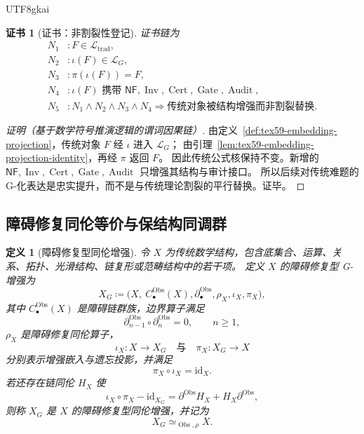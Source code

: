 \documentclass[12pt]{article}
\newtheorem{definition}{定义}[section]
\newtheorem{Certificate}{证书}[section]
\newcommand{\NF}{\mathsf{NF}}
\newcommand{\DefEq}{\coloneqq}
\newcommand{\id}{\mathrm{id}}
\DeclareMathOperator{\Cert}{Cert}
\DeclareMathOperator{\Audit}{Audit}
\DeclareMathOperator{\Gate}{Gate}
\DeclareMathOperator{\Obs}{Obs}
\DeclareMathOperator{\Inv}{Inv}
\begin{document}
\begin{CJK*}{UTF8}{gkai}
\begin{Certificate}[证书：非割裂性登记]
\label{cert:tex59-non-separated-traditional-problems}
证书链为
\[
\begin{aligned}
  N_1 &: F\in\mathcal L_{\mathrm{trad}},\\
  N_2 &: \iota(F)\in\mathcal L_G,\\
  N_3 &: \pi(\iota(F))=F,\\
  N_4 &: \iota(F)\text{ 携带 }\NF,\Inv,\Cert,\Gate,\Audit,\\
  N_5 &: N_1\wedge N_2\wedge N_3\wedge N_4
         \Rightarrow
         \text{传统对象被结构增强而非割裂替换}.
\end{aligned}
\]
\end{Certificate}

\begin{proof}[证明（基于数学符号推演逻辑的谓词因果链）]
由定义~\ref{def:tex59-embedding-projection}，传统对象 \(F\) 经 \(\iota\) 进入 \(\mathcal L_G\)；
由引理~\ref{lem:tex59-embedding-projection-identity}，再经 \(\pi\) 返回 \(F\)。
因此传统公式核保持不变。新增的 \(\NF,\Inv,\Cert,\Gate,\Audit\) 只增强其结构与审计接口。
所以后续对传统难题的 G-化表达是忠实提升，而不是与传统理论割裂的平行替换。证毕。
\end{proof}

\subsection{障碍修复同伦等价与保结构同调群}
\label{subsec:tex59-obstruction-repair-homotopy-equivalence}

\begin{definition}[障碍修复型同伦增强]
\label{def:tex59-obstruction-repair-enhancement}
令 \(X\) 为传统数学结构，包含底集合、运算、关系、拓扑、光滑结构、链复形或范畴结构中的若干项。
定义 \(X\) 的障碍修复型 G-增强为
\[
  X_G
  \DefEq
  \bigl(
  X,\ C_\bullet^{\Obs}(X),\partial_\bullet^{\Obs},
  \rho_X,\iota_X,\pi_X
  \bigr),
\]
其中 \(C_\bullet^{\Obs}(X)\) 是障碍链群族，边界算子满足
\[
  \partial_{n-1}^{\Obs}\circ\partial_n^{\Obs}=0,
  \qquad n\ge1,
\]
\(\rho_X\) 是障碍修复同伦算子，
\[
  \iota_X:X\longrightarrow X_G
  \quad\text{与}\quad
  \pi_X:X_G\longrightarrow X
\]
分别表示增强嵌入与遗忘投影，并满足
\[
  \pi_X\circ\iota_X=\id_X.
\]
若还存在链同伦 \(H_X\) 使
\[
  \iota_X\circ\pi_X-\id_{X_G}
  =
  \partial^{\Obs}H_X+H_X\partial^{\Obs},
\]
则称 \(X_G\) 是 \(X\) 的障碍修复型同伦增强，并记为
\[
  X_G\simeq_{\Obs,\rho} X.
\]
\end{definition}


\end{CJK*}
\end{document}
